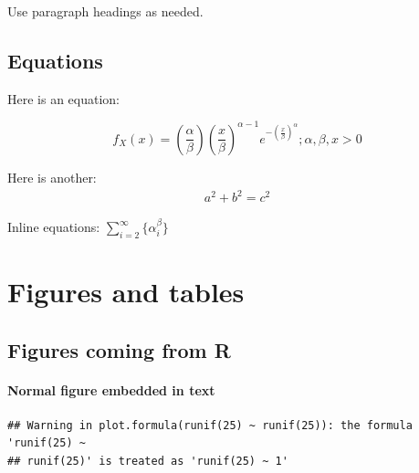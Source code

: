 \documentclass[useAMS,usenatbib,referee]{biom}
\begin{document}
Use paragraph headings as needed.

\hypertarget{equations}{%
\subsection{Equations}\label{equations}}

Here is an equation:

\[ f_{X}(x) = \left(\frac{\alpha}{\beta}\right)\left(\frac{x}{\beta}\right)^{\alpha-1}e^{-\left(\frac{x}{\beta}\right)^{\alpha}}; \alpha,\beta,x > 0 \]

Here is another: \begin{align}
a^2+b^2=c^2
\end{align}

Inline equations: \(\sum_{i = 2}^\infty\{\alpha_i^\beta\}\)

\hypertarget{figures-and-tables}{%
\section{Figures and tables}\label{figures-and-tables}}

\hypertarget{figures-coming-from-r}{%
\subsection{Figures coming from R}\label{figures-coming-from-r}}

\hypertarget{normal-figure-embedded-in-text}{%
\paragraph{Normal figure embedded in
text}\label{normal-figure-embedded-in-text}}

\begin{verbatim}
## Warning in plot.formula(runif(25) ~ runif(25)): the formula 'runif(25) ~
## runif(25)' is treated as 'runif(25) ~ 1'
\end{verbatim}
\end{document}
